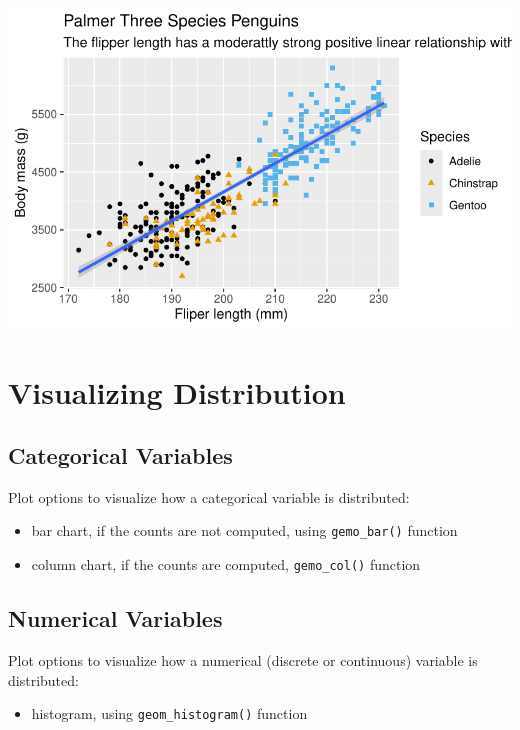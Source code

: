 \documentclass[
  letterpaper,
  DIV=11,
  numbers=noendperiod]{scrreprt}
\providecommand{\tightlist}{%
  \setlength{\itemsep}{0pt}\setlength{\parskip}{0pt}}\usepackage{longtable,booktabs,array}
\begin{document}
\includegraphics{src/r-for-data-science/01-data-viz_files/figure-pdf/unnamed-chunk-18-1.pdf}

\section{Visualizing Distribution}\label{visualizing-distribution}

\subsection{Categorical Variables}\label{categorical-variables}

Plot options to visualize how a categorical variable is distributed:

\begin{itemize}
\tightlist
\item
  bar chart, if the counts are not computed, using \texttt{gemo\_bar()}
  function
\item
  column chart, if the counts are computed, \texttt{gemo\_col()}
  function
\end{itemize}

\subsection{Numerical Variables}\label{numerical-variables}

Plot options to visualize how a numerical (discrete or continuous)
variable is distributed:

\begin{itemize}
\tightlist
\item
  histogram, using \texttt{geom\_histogram()} function
\end{itemize}
\end{document}
